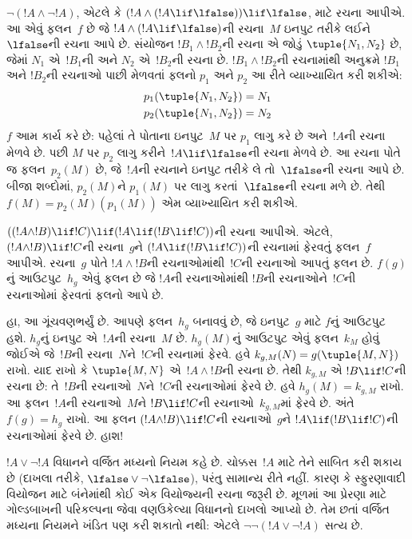 \documentclass[../../../include/open-logic-section]{subfiles}
\begin{document}
\begin{ex}
$\lnot(!A \land \lnot !A)$, એટલે કે $(!A
\land (!A \lif \lfalse)) \lif \lfalse$, માટે રચના આપીએ.
આ એવું ફલન~$f$ છે જે $!A \land (!A \lif \lfalse)$ની
રચના~$M$ ઇનપુટ તરીકે લઈને~$\lfalse$ની રચના આપે છે.
સંયોજન $!B_1 \land !B_2$ની રચના એ જોડું $\tuple{N_1, N_2}$
છે, જેમાં $N_1$ એ~$!B_1$ની અને $N_2$ એ~$!B_2$ની રચના છે.
$!B_1 \land !B_2$ની રચનામાંથી અનુક્રમે $!B_1$ અને $!B_2$ની
રચનાઓ પાછી મેળવતાં ફલનો $p_1$ અને $p_2$ આ રીતે વ્યાખ્યાયિત
કરી શકીએ:
\begin{align*}
  p_1(\tuple{N_1, N_2}) &= N_1\\
  p_2(\tuple{N_1, N_2}) &= N_2
\end{align*}
$f$ આમ કાર્ય કરે છે: પહેલાં તે પોતાના ઇનપુટ~$M$ પર $p_1$
લાગુ કરે છે અને~$!A$ની રચના મેળવે છે. પછી $M$ પર $p_2$
લાગુ કરીને~$!A \lif \lfalse$ની રચના મેળવે છે. આ રચના
પોતે જ ફલન~$p_2(M)$ છે, જે~$!A$ની રચનાને ઇનપુટ તરીકે
લે તો~$\lfalse$ની રચના આપે છે. બીજા શબ્દોમાં, $p_2(M)$ને
$p_1(M)$ પર લાગુ કરતાં~$\lfalse$ની રચના મળે છે. તેથી
$f(M) = p_2(M)(p_1(M))$ એમ વ્યાખ્યાયિત કરી શકીએ.
\end{ex}

\begin{ex}
$((!A \land !B) \lif !C) \lif (!A \lif (!B \lif !C))$ની
રચના આપીએ. એટલે, $(!A \land !B) \lif !C$ની રચના~$g$ને
$(!A \lif (!B \lif !C))$ની રચનામાં ફેરવતું ફલન~$f$
આપીએ. રચના~$g$ પોતે $!A \land !B$ની રચનાઓમાંથી~$!C$ની
રચનાઓ આપતું ફલન છે. 
$f(g)$નું આઉટપુટ~$h_g$ એવું ફલન છે જે $!A$ની રચનાઓમાંથી
$!B$ની રચનાઓને~$!C$ની રચનાઓમાં ફેરવતાં ફલનો આપે છે.

હા, આ ગૂંચવણભર્યું છે. આપણે ફલન~$h_g$ બનાવવું છે, જે
ઇનપુટ~$g$ માટે $f$નું આઉટપુટ હશે. $h_g$નું ઇનપુટ એ~$!A$ની
રચના~$M$ છે. $h_g(M)$નું આઉટપુટ એવું ફલન~$k_M$ હોવું જોઈએ
જે~$!B$ની રચના~$N$ને~$!C$ની રચનામાં ફેરવે. હવે
$k_{g,M}(N) = g(\tuple{M, N})$ રાખો. યાદ રાખો કે
$\tuple{M, N}$ એ~$!A \land !B$ની રચના છે. તેથી
$k_{g,M}$ એ $!B \lif !C$ની રચના છે: તે~$!B$ની
રચનાઓ~$N$ને~$!C$ની રચનાઓમાં ફેરવે છે. હવે
$h_g(M) = k_{g,M}$ રાખો. આ ફલન~$!A$ની રચનાઓ~$M$ને
$!B \lif !C$ની રચનાઓ~$k_{g,M}$માં ફેરવે છે. અંતે
$f(g) = h_g$ રાખો. આ ફલન $(!A \land !B) \lif !C$ની
રચનાઓ~$g$ને $!A \lif (!B \lif !C)$ની રચનાઓમાં ફેરવે
છે. હાશ!{}
\end{ex}

$!A \lor \lnot !A$ વિધાનને વર્જિત મધ્યનો નિયમ કહે છે.
ચોક્કસ~$!A$ માટે તેને સાબિત કરી શકાય છે (દાખલા તરીકે,
$\lfalse \lor \lnot \lfalse$), પરંતુ સામાન્ય રીતે નહીં.
કારણ કે સ્ફુરણાવાદી વિયોજન માટે બંનેમાંથી કોઈ એક વિયોજ્યની
રચના જરૂરી છે. મૂળમાં આ પ્રેરણા માટે ગોલ્ડબાખની પરિકલ્પના
જેવા વણઉકેલ્યા વિધાનનો દાખલો આપ્યો છે.
તેમ છતાં વર્જિત મધ્યના નિયમને ખંડિત પણ કરી શકાતો નથી:
એટલે $\lnot \lnot (!A \lor \lnot !A)$ સત્ય છે.
\end{document}
